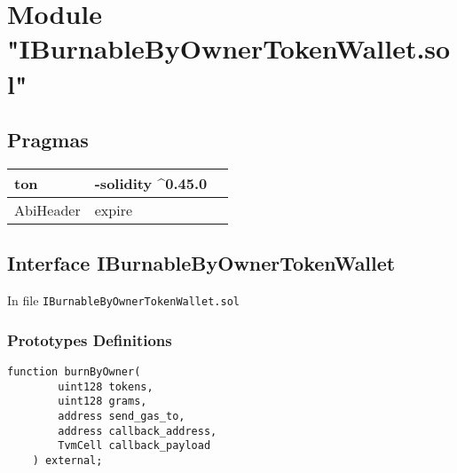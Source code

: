
\section{Module "IBurnableByOwnerTokenWallet.sol"}


\subsection{Pragmas}


\noindent\begin{tabular}{|l|l|p{5cm}|}\hline
ton & -solidity \^{}0.45.0 &\\\hline
AbiHeader &  expire &\\\hline
\end{tabular}


\subsection{Interface IBurnableByOwnerTokenWallet}


In file {\tt IBurnableByOwnerTokenWallet.sol}

\subsubsection{Prototypes Definitions}

\vspace{2cm}

\begin{lstlisting}[firstnumber=5]
    function burnByOwner(
        uint128 tokens,
        uint128 grams,
        address send_gas_to,
        address callback_address,
        TvmCell callback_payload
    ) external;
\end{lstlisting}
